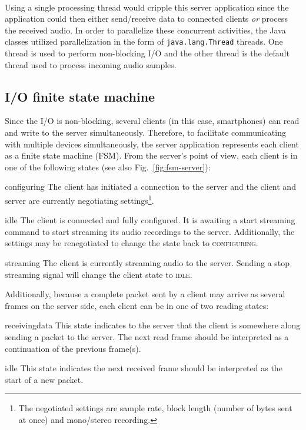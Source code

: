 \documentclass[a4paper, notitlepage]{report}
\begin{document}
\paragraph*{}
Using a single processing thread would cripple this server application since the application could then either send/receive data to connected clients \emph{or} process the received audio. In order to parallelize these concurrent activities, the Java classes utilized parallelization in the form of \texttt{java.lang.Thread} threads. One thread is used to perform non-blocking I/O and the other thread is the default \matlab thread used to process incoming audio samples.

\subsection{I/O finite state machine}
\label{sec:io_fsm}
Since the I/O is non-blocking, several clients (in this case, smartphones) can read and write to the server simultaneously. Therefore, to facilitate communicating with multiple devices simultaneously, the server application represents each client as a finite state machine (FSM). From the server's point of view, each client is in one of the following states (see also Fig.~\ref{fig:fsm-server}):

\begin{StateDescription}
\item[configuring] The client has initiated a connection to the server and the client and server are currently negotiating settings\footnote{The negotiated settings are sample rate, block length (number of bytes sent at once) and mono/stereo recording.}.

\item[idle] The client is connected and fully configured. It is awaiting a start streaming command to start streaming its audio recordings to the server. Additionally, the settings may be renegotiated to change the state back to \textsc{configuring}.

\item[streaming] The client is currently streaming audio to the server. Sending a stop streaming signal will change the client state to \textsc{idle}.
\end{StateDescription}
\noindent
Additionally, because a complete packet sent by a client may arrive as several frames on the server side, each client can be in one of two reading states:
\begin{StateDescription}
\item[receivingdata] This state indicates to the server that the client is somewhere along sending a packet to the server. The next read frame should be interpreted as a continuation of the previous frame(s).
\item[idle] This state indicates the next received frame should be interpreted as the start of a new packet.
\end{StateDescription}
\end{document}
